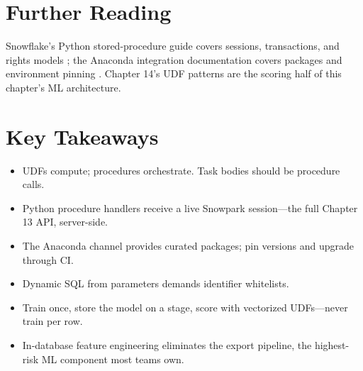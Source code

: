 \section{Further Reading}
Snowflake's Python stored-procedure guide covers sessions, transactions, and rights models \cite{snowflakeStoredProceduresDocs}; the Anaconda integration documentation covers packages and environment pinning \cite{snowflakeAnacondaDocs}. Chapter 14's UDF patterns \cite{snowflakeUdfPythonDocs} are the scoring half of this chapter's ML architecture.

\section*{Key Takeaways}
\begin{itemize}
    \item UDFs compute; procedures orchestrate. Task bodies should be procedure calls.
    \item Python procedure handlers receive a live Snowpark session---the full Chapter 13 API, server-side.
    \item The Anaconda channel provides curated packages; pin versions and upgrade through CI.
    \item Dynamic SQL from parameters demands identifier whitelists.
    \item Train once, store the model on a stage, score with vectorized UDFs---never train per row.
    \item In-database feature engineering eliminates the export pipeline, the highest-risk ML component most teams own.
\end{itemize}

